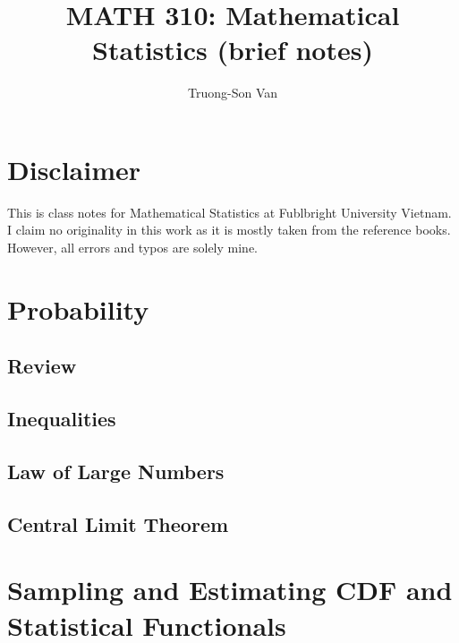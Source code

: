 \documentclass[
  openany]{book}
\title{MATH 310: Mathematical Statistics (brief notes)}
\author{Truong-Son Van}
\date{}
\begin{document}
\maketitle

{
\setcounter{tocdepth}{2}
\tableofcontents
}
\hypertarget{disclaimer}{%
\chapter*{Disclaimer}\label{disclaimer}}


This is class notes for Mathematical Statistics at Fublbright University Vietnam.
I claim no originality in this work as it is mostly taken from the reference books.
However, all errors and typos are solely mine.

\newpage

\newcommand{\vectorproj}[2][]{\mathrm{proj}_{\vect{#1}}\vect{#2}}
\newcommand{\vectorcomp}[2][]{\mathrm{comp}_{\vect{#1}}\vect{#2}}
\newcommand{\vect}{\mathbf}
\newcommand{\R}{\mathbb{R}}

\hypertarget{probability}{%
\chapter{Probability}\label{probability}}

\hypertarget{review}{%
\section{Review}\label{review}}

\hypertarget{inequalities}{%
\section{Inequalities}\label{inequalities}}

\hypertarget{law-of-large-numbers}{%
\section{Law of Large Numbers}\label{law-of-large-numbers}}

\hypertarget{central-limit-theorem}{%
\section{Central Limit Theorem}\label{central-limit-theorem}}

\hypertarget{sampling-and-estimating-cdf-and-statistical-functionals}{%
\chapter{Sampling and Estimating CDF and Statistical Functionals}\label{sampling-and-estimating-cdf-and-statistical-functionals}}
\end{document}
